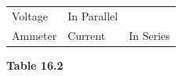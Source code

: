 {{\begin{center}
\begin{tabular}[t]{|l|l|l|}
        Voltage &
    
    
        In Parallel%
     \tabularnewline\cline{1-1}\cline{2-2}\cline{3-3}
    
    
        Ammeter &
    
    
        Current &
    
    
        In Series%
     \tabularnewline\cline{1-1}\cline{2-2}\cline{3-3}
    \end{tabular}
      \end{center}
    \begin{center}{\small\bfseries Table 16.2}\end{center}
    
    \addtocounter{footnote}{-0}
    
          }{ %
        
    
        \begin{center}
      
      \label{m38773*id67892}
      
    \noindent
      \tablelasttail{}
      \begin{xtabular}[t]{|l|l|l|}\hline
    

\end{xtabular}
\end{center}}}
